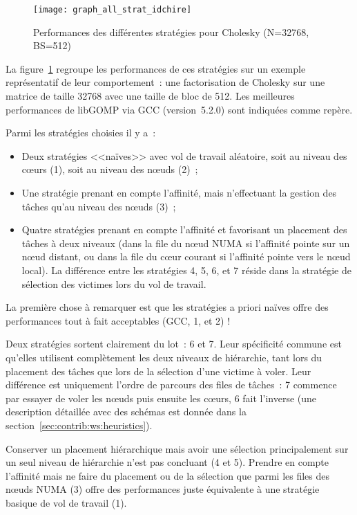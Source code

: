 \begin{figure}[ht]
  \centering
  \texttt{[image: graph\_all\_strat\_idchire]}
  \caption{Performances des différentes stratégies pour Cholesky (N=32768, BS=512)}\label{fig:contribs:perf_eval:eval-strategies}
\end{figure}

La figure~\ref{fig:contribs:perf_eval:eval-strategies} regroupe les performances de ces stratégies sur un exemple représentatif de leur comportement~: une factorisation de Cholesky sur une matrice de taille 32768 avec une taille de bloc de 512.
Les meilleures performances de libGOMP via GCC (version~5.2.0) sont indiquées comme repère.

Parmi les stratégies choisies il y a~:
\begin{itemize}
  \item Deux stratégies <<naïves>> avec vol de travail aléatoire, soit au niveau des cœurs (1), soit au niveau des nœuds (2)~;
  \item Une stratégie prenant en compte l'affinité, mais n'effectuant la gestion des tâches qu'au niveau des nœuds (3)~;
  \item Quatre stratégies prenant en compte l'affinité et favorisant un placement des tâches à deux niveaux (dans la file du nœud NUMA si l'affinité pointe sur un nœud distant, ou dans la file du cœur courant si l'affinité pointe vers le nœud local). La différence entre les stratégies 4, 5, 6, et 7 réside dans la stratégie de sélection des victimes lors du vol de travail.
\end{itemize}

La première chose à remarquer est que les stratégies a priori naïves offre des performances tout à fait acceptables (GCC, 1, et 2) !

Deux stratégies sortent clairement du lot~: 6 et 7. Leur spécificité commune est qu'elles utilisent complètement les deux niveaux de hiérarchie, tant lors du placement des tâches que lors de la sélection d'une victime à voler.
Leur différence est uniquement l'ordre de parcours des files de tâches~: 7 commence par essayer de voler les nœuds puis ensuite les cœurs, 6 fait l'inverse (une description détaillée avec des schémas est donnée dans la section~\ref{sec:contrib:ws:heuristics}).

Conserver un placement hiérarchique mais avoir une sélection principalement sur un seul niveau de hiérarchie n'est pas concluant (4 et 5).
Prendre en compte l'affinité mais ne faire du placement ou de la sélection que parmi les files des nœuds NUMA (3) offre des performances juste équivalente à une stratégie basique de vol de travail (1).

